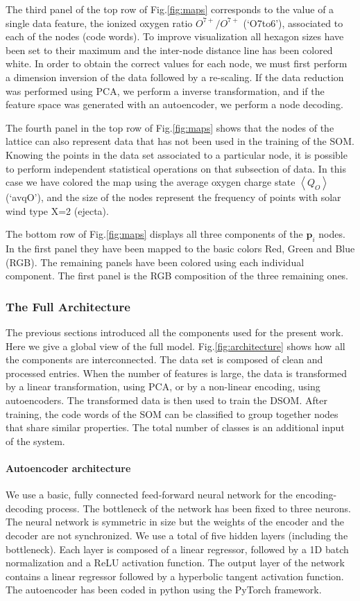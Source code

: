 The third panel of the top row of Fig.\ref{fig:maps} corresponds to the value of a single data feature, the ionized oxygen ratio $O^{7+}/O^{7+}$ (`O7to6'), associated to each of the nodes (code words). To improve visualization all hexagon sizes have been set to their maximum and the inter-node distance line has been colored white. In order to obtain the correct values for each node, we must first perform a dimension inversion of the data followed by a re-scaling. If the data reduction was performed using PCA, we perform a inverse transformation, and if the feature space was generated with an autoencoder, we perform a node decoding.

The fourth panel in the top row of Fig.\ref{fig:maps} shows that the nodes of the lattice can also represent data that has not been used in the training of the SOM. Knowing the points in the data set associated to a particular node, it is possible to perform independent statistical operations on that subsection of data. In this case we have colored the map using the average oxygen charge state $\left<Q_{O}\right>$ (`avqO'), and the size of the nodes represent the frequency of points with solar wind type X=2 (ejecta).

The bottom row of Fig.\ref{fig:maps} displays all three components of the $\boldsymbol{p}_i$ nodes. In the first panel they have been mapped to the basic colors Red, Green and Blue (RGB). The remaining panels have been colored using each individual component. The first panel is the RGB composition of the three remaining ones.

\subsubsection{The Full Architecture}
The previous sections introduced all the components used for the present work. Here we give a global view of the full model. Fig.\ref{fig:architecture} shows how all the components are interconnected. The data set is composed of clean and processed entries. When the number of features is large, the data is transformed by a linear transformation, using PCA, or by a non-linear encoding, using autoencoders. The transformed data is then used to train the DSOM. After training, the code words of the SOM can be classified to group together nodes that share similar properties. The total number of classes is an additional input of the system.

\paragraph{Autoencoder architecture}
We use a basic, fully connected feed-forward neural network for the encoding-decoding process. The bottleneck of the network has been fixed to three neurons. The neural network is symmetric in size but the weights of the encoder and the decoder are not synchronized. We use a total of five hidden layers (including the bottleneck). Each layer is composed of a linear regressor, followed by a 1D batch normalization and a ReLU activation function. The output layer of the network contains a linear regressor followed by a hyperbolic tangent activation function. The autoencoder has been coded in python using the PyTorch framework.

